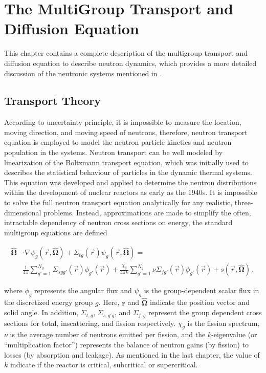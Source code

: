\cleardoublepage

\chapter{The MultiGroup Transport and Diffusion Equation}
\label{chapter:multigroup}

This chapter contains a complete description of the multigroup transport and diffusion equation to describe neutron dynamics, which provides a more detailed discussion of the neutronic systems mentioned in . 

\section{Transport Theory}

According to uncertainty principle, it is impossible to measure the location, moving direction, and moving speed of neutrons, therefore, neutron transport equation is employed to model the neutron particle kinetics and neutron population in the systems.
Neutron transport can be well modeled by linearization of the Boltzmann transport equation, which was initially used to describes the statistical behaviour of particles in the dynamic thermal systems.
This equation was developed and applied to determine the neutron distributions within the development of nuclear reactors as early as the 1940s.
It is impossible to solve the full neutron transport equation analytically for any realistic, three-dimensional problems.
Instead, approximations are made to simplify the often, intractable dependency of neutron cross sections on energy, the standard multigroup equations are defined 

\begin{equation}
\begin{split}
  \bm{\hat{\Omega}} & \cdot \nabla \psi_g(\vec{r},\bm{\hat{\Omega}}) +
    \Sigma_{t g}(\vec{r}) \psi_{g}(\vec{r},\bm{\hat{\Omega}}) = \\
   & \frac{1}{4\pi} \sum\limits^{N_g}_{g'=1} \Sigma_{s g g'}(\vec{r}) \phi_{g'}(\vec{r}) +
    \frac{\chi_g}{4\pi k} \sum\limits^{N_g}_{g'=1} \nu\Sigma_{fg'}(\vec{r}) \phi_{g'}(\vec{r}) 
    + s(\vec{r},\bm{\hat{\Omega}})\, ,
\end{split}
\label{eq:transport}
\end{equation}

where $\phi_g$ represents the angular flux and $\psi_g$ is the group-dependent scalar flux in the discretized energy group $g$.  
Here, $\mathbf{r}$ and $\bm{\hat{\Omega}}$ indicate the position vector and solid angle.
In addition, $\Sigma_{t,g}$, $\Sigma_{s,g\prime g}$, and $\Sigma_{f,g}$ represent the group dependent cross sections for total, inscattering, and fission respectively.  
$\chi_g$ is the fission spectrum, $\nu$ is the average number of neutrons emitted per fission, and the $k$-eigenvalue (or ``multiplication factor'') represents the balance of neutron gains (by fission) to losses (by absorption and leakage).  
As mentioned in the last chapter, the value of $k$ indicate if the reactor is critical, subcritical or supercritical.

